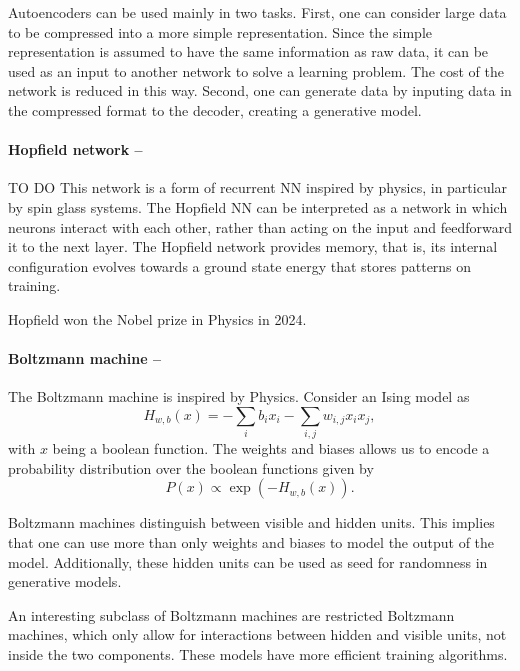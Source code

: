 \documentclass[]{report}
\newcommand{\alert}[1]{{\color{red} #1}}
\begin{document}
Autoencoders can be used mainly in two tasks. First, one can consider large data to be compressed into a more simple representation. Since the simple representation is assumed to have the same information as raw data, it can be used as an input to another network to solve a learning problem. The cost of the network is reduced in this way. Second, one can generate data by inputing data in the compressed format to the decoder, creating a generative model. 

\paragraph{Hopfield network --} \alert{TO DO} This network is a form of recurrent NN inspired by physics, in particular by spin glass systems. The Hopfield NN can be interpreted as a network in which neurons interact with each other, rather than acting on the input and feedforward it to the next layer. The Hopfield network provides memory, that is, its internal configuration evolves towards a ground state energy that stores patterns on training. 

Hopfield won the Nobel prize in Physics in 2024.

\paragraph{Boltzmann machine --} The Boltzmann machine is inspired by Physics. Consider an Ising model as
\begin{equation}
H_{w, b}(x) = - \sum_i b_i x_i - \sum_{i, j} w_{i, j} x_i x_j, 
\end{equation}
with $x$ being a boolean function. The weights and biases allows us to encode a probability distribution over the boolean functions given by 
\begin{equation}
P(x) \propto \exp(- H_{w, b}(x)). 
\end{equation}

Boltzmann machines distinguish between visible and hidden units. This implies that one can use more than only weights and biases to model the output of the model. Additionally, these hidden units can be used as seed for randomness in generative models. 

An interesting subclass of Boltzmann machines are restricted Boltzmann machines, which only allow for interactions between hidden and visible units, not inside the two components. These models have more efficient training algorithms. 
\end{document}
